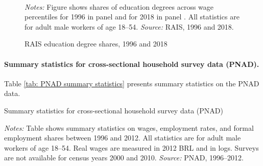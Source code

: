 \begin{figure}[!htb]
  \centering
  \caption{RAIS education degree shares, 1996 and 2018\label{fig: RAIS summary stats-2}}
  \prefigvspace
  \\
  \postfigvspace
  \begin{minipage}[t]{1\columnwidth}%
    \begin{spacing}{0.75}
      \emph{\scriptsize{}Notes:}{\scriptsize{} Figure shows shares of education
      degrees across wage percentiles for 1996 in panel 
      and for 2018 in panel . All
      statistics are for adult male workers of age 18--54. %
      \emph{\scriptsize{}Source:} RAIS, 1996 and 2018.}
    \end{spacing}
  \end{minipage}
\end{figure}


\clearpage


\paragraph{Summary statistics for cross-sectional household survey data (PNAD).}

Table \ref{tab: PNAD summary statistics} presents summary statistics
on the PNAD data.


\begin{table}[!htb]
  \centering
  \caption{Summary statistics for cross-sectional household survey data (PNAD)\label{tab: PNAD summary statistics}}
  \pretabvspace
  
  \posttabvspace
  \begin{minipage}[t]{1\columnwidth}%
    \begin{spacing}{0.75}
      \emph{\scriptsize{}Notes:}{\scriptsize{} Table shows summary statistics
      on wages, employment rates, and formal employment shares between 1996
      and 2012. All statistics are for adult male workers of age 18--54.
      Real wages are measured in 2012 BRL and in logs. Surveys are not available
      for census years 2000 and 2010. %
      \emph{\scriptsize{}Source:} PNAD, 1996--2012.}
    \end{spacing}
  \end{minipage}
\end{table}


